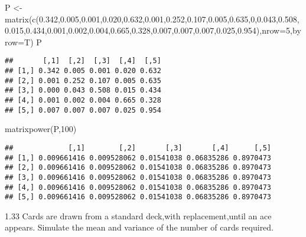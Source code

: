 \documentclass[
]{article}
\newenvironment{Shaded}{\begin{snugshade}}{\end{snugshade}}
\newcommand{\AttributeTok}[1]{\textcolor[rgb]{0.77,0.63,0.00}{#1}}
\newcommand{\DecValTok}[1]{\textcolor[rgb]{0.00,0.00,0.81}{#1}}
\newcommand{\FloatTok}[1]{\textcolor[rgb]{0.00,0.00,0.81}{#1}}
\newcommand{\FunctionTok}[1]{\textcolor[rgb]{0.00,0.00,0.00}{#1}}
\newcommand{\NormalTok}[1]{#1}
\newcommand{\OtherTok}[1]{\textcolor[rgb]{0.56,0.35,0.01}{#1}}
\begin{document}
\begin{Shaded}
\begin{Highlighting}[]
\NormalTok{P }\OtherTok{\textless{}{-}} \FunctionTok{matrix}\NormalTok{(}\FunctionTok{c}\NormalTok{(}\FloatTok{0.342}\NormalTok{,}\FloatTok{0.005}\NormalTok{,}\FloatTok{0.001}\NormalTok{,}\FloatTok{0.020}\NormalTok{,}\FloatTok{0.632}\NormalTok{,}\FloatTok{0.001}\NormalTok{,}\FloatTok{0.252}\NormalTok{,}\FloatTok{0.107}\NormalTok{,}\FloatTok{0.005}\NormalTok{,}\FloatTok{0.635}\NormalTok{,}\DecValTok{0}\NormalTok{,}\FloatTok{0.043}\NormalTok{,}\FloatTok{0.508}\NormalTok{,}\FloatTok{0.015}\NormalTok{,}\FloatTok{0.434}\NormalTok{,}\FloatTok{0.001}\NormalTok{,}\FloatTok{0.002}\NormalTok{,}\FloatTok{0.004}\NormalTok{,}\FloatTok{0.665}\NormalTok{,}\FloatTok{0.328}\NormalTok{,}\FloatTok{0.007}\NormalTok{,}\FloatTok{0.007}\NormalTok{,}\FloatTok{0.007}\NormalTok{,}\FloatTok{0.025}\NormalTok{,}\FloatTok{0.954}\NormalTok{),}\AttributeTok{nrow=}\DecValTok{5}\NormalTok{,}\AttributeTok{byrow=}\NormalTok{T)}
\NormalTok{P}
\end{Highlighting}
\end{Shaded}

\begin{verbatim}
##       [,1]  [,2]  [,3]  [,4]  [,5]
## [1,] 0.342 0.005 0.001 0.020 0.632
## [2,] 0.001 0.252 0.107 0.005 0.635
## [3,] 0.000 0.043 0.508 0.015 0.434
## [4,] 0.001 0.002 0.004 0.665 0.328
## [5,] 0.007 0.007 0.007 0.025 0.954
\end{verbatim}

\begin{Shaded}
\begin{Highlighting}[]
\FunctionTok{matrixpower}\NormalTok{(P,}\DecValTok{100}\NormalTok{)}
\end{Highlighting}
\end{Shaded}

\begin{verbatim}
##             [,1]        [,2]       [,3]       [,4]      [,5]
## [1,] 0.009661416 0.009528062 0.01541038 0.06835286 0.8970473
## [2,] 0.009661416 0.009528062 0.01541038 0.06835286 0.8970473
## [3,] 0.009661416 0.009528062 0.01541038 0.06835286 0.8970473
## [4,] 0.009661416 0.009528062 0.01541038 0.06835286 0.8970473
## [5,] 0.009661416 0.009528062 0.01541038 0.06835286 0.8970473
\end{verbatim}

1.33 Cards are drawn from a standard deck,with replacement,until an ace
appears. Simulate the mean and variance of the number of cards required.
\end{document}
